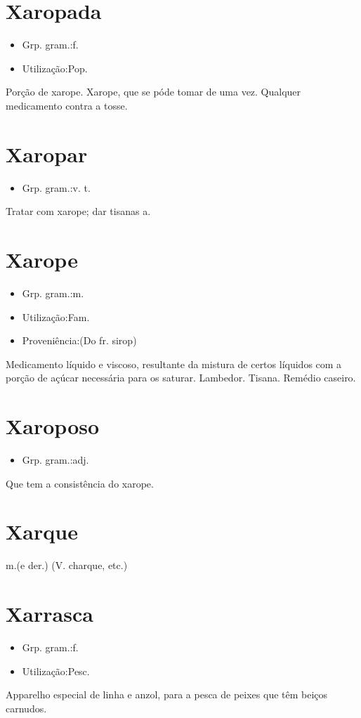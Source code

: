 \section{Xaropada}
\begin{itemize}
\item {Grp. gram.:f.}
\end{itemize}
\begin{itemize}
\item {Utilização:Pop.}
\end{itemize}
Porção de xarope.
Xarope, que se póde tomar de uma vez.
Qualquer medicamento contra a tosse.
\section{Xaropar}
\begin{itemize}
\item {Grp. gram.:v. t.}
\end{itemize}
Tratar com xarope; dar tisanas a.
\section{Xarope}
\begin{itemize}
\item {Grp. gram.:m.}
\end{itemize}
\begin{itemize}
\item {Utilização:Fam.}
\end{itemize}
\begin{itemize}
\item {Proveniência:(Do fr. \textunderscore sirop\textunderscore )}
\end{itemize}
Medicamento líquido e viscoso, resultante da mistura de certos líquidos com a porção de açúcar necessária para os saturar.
Lambedor.
Tisana.
Remédio caseiro.
\section{Xaroposo}
\begin{itemize}
\item {Grp. gram.:adj.}
\end{itemize}
Que tem a consistência do xarope.
\section{Xarque}
\textunderscore m.\textunderscore  (e der.)
(V. \textunderscore charque\textunderscore , etc.)
\section{Xarrasca}
\begin{itemize}
\item {Grp. gram.:f.}
\end{itemize}
\begin{itemize}
\item {Utilização:Pesc.}
\end{itemize}
Apparelho especial de linha e anzol, para a pesca de peixes que têm beiços carnudos.
